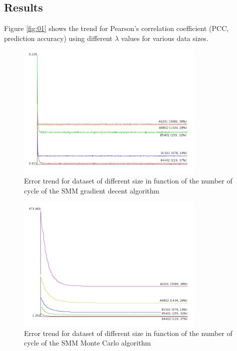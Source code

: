 \documentclass{bioinfo}
\begin{document}
\begin{application}
\section*{Results}


Figure \ref{fig:01} shows the trend for Pearson's correlation coefficient (PCC, prediction accuracy) using different $\lambda$ values for various data sizes.


\begin{figure}[!tpb]
\centerline{\includegraphics[width=9cm]{fig/smm_error.png}}
\caption{Error trend for dataset of different size in function of the number of cycle of the SMM gradient decent algorithm}
\label{fig:03}
\end{figure}

\begin{figure}[!tpb]
\centerline{\includegraphics[width=9cm]{fig/smm_mc_error.png}}
\caption{Error trend for dataset of different size in function of the number of cycle of the SMM Monte Carlo algorithm}
\label{fig:04}
\end{figure}


\end{application}
\end{document}
